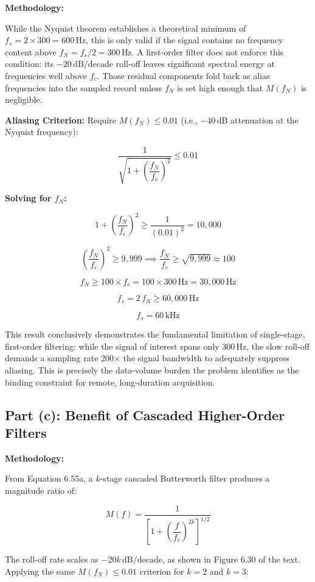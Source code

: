 \documentclass[11pt]{article}
\begin{document}
\textbf{Methodology:}

While the Nyquist theorem establishes a theoretical minimum of $f_s = 2 \times 300 = 600\,\text{Hz}$,
this is only valid if the signal contains no frequency content above $f_N = f_s/2 = 300\,\text{Hz}$.
A first-order filter does not enforce this condition: its $-20\,\text{dB/decade}$ roll-off leaves
significant spectral energy at frequencies well above $f_c$. Those residual components fold back
as alias frequencies into the sampled record unless $f_N$ is set high enough that $M(f_N)$ is
negligible.

\textbf{Aliasing Criterion:} Require $M(f_N) \leq 0.01$ (i.e., $-40\,\text{dB}$ attenuation at the
Nyquist frequency):

\[
  \frac{1}{\sqrt{1 + \left(\dfrac{f_N}{f_c}\right)^2}} \leq 0.01
\]

\textbf{Solving for $f_N$:}

\[
  1 + \left(\frac{f_N}{f_c}\right)^2 \geq \frac{1}{(0.01)^2} = 10{,}000
\]

\[
  \left(\frac{f_N}{f_c}\right)^2 \geq 9{,}999
  \implies
  \frac{f_N}{f_c} \geq \sqrt{9{,}999} \approx 100
\]

\[
  f_N \geq 100 \times f_c = 100 \times 300\,\text{Hz} = 30{,}000\,\text{Hz}
\]

\[
  f_s = 2\,f_N \geq 60{,}000\,\text{Hz}
\]

\[
  \boxed{f_s = 60\,\text{kHz}}
\]

This result conclusively demonstrates the fundamental limitation of single-stage, first-order
filtering: while the signal of interest spans only 300\,Hz, the slow roll-off demands a sampling
rate 200$\times$ the signal bandwidth to adequately suppress aliasing. This is precisely the
data-volume burden the problem identifies as the binding constraint for remote, long-duration
acquisition.


\subsection*{Part (c): Benefit of Cascaded Higher-Order Filters}

\textbf{Methodology:}

From Equation 6.55a, a $k$-stage cascaded Butterworth filter produces a magnitude ratio of:

\[
  M(f) = \frac{1}{\left[1 + \left(\dfrac{f}{f_c}\right)^{2k}\right]^{1/2}}
\]

The roll-off rate scales as $-20k\,\text{dB/decade}$, as shown in Figure 6.30 of the text. Applying
the same $M(f_N) \leq 0.01$ criterion for $k = 2$ and $k = 3$:
\end{document}
